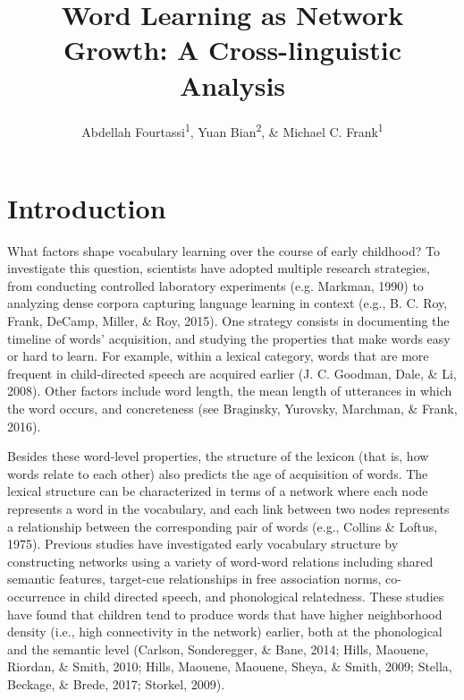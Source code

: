 \documentclass[english,floatsintext,man]{apa6}
\title{Word Learning as Network Growth: A Cross-linguistic Analysis}
\author{Abdellah Fourtassi\textsuperscript{1}, Yuan Bian\textsuperscript{2}, \& Michael C. Frank\textsuperscript{1}}
\affiliation{
    \vspace{0.5cm}
          \textsuperscript{1} Department of Psychology, Stanford University\\
          \textsuperscript{2} Department of Psychology, University of Illinois  }
\theoremstyle{definition}
\theoremstyle{definition}
\theoremstyle{definition}
\theoremstyle{remark}
\begin{document}
\maketitle

\setcounter{secnumdepth}{0}



\section{Introduction}\label{introduction}

What factors shape vocabulary learning over the course of early
childhood? To investigate this question, scientists have adopted
multiple research strategies, from conducting controlled laboratory
experiments (e.g. Markman, 1990) to analyzing dense corpora capturing
language learning in context (e.g., B. C. Roy, Frank, DeCamp, Miller, \&
Roy, 2015). One strategy consists in documenting the timeline of words'
acquisition, and studying the properties that make words easy or hard to
learn. For example, within a lexical category, words that are more
frequent in child-directed speech are acquired earlier (J. C. Goodman,
Dale, \& Li, 2008). Other factors include word length, the mean length
of utterances in which the word occurs, and concreteness (see Braginsky,
Yurovsky, Marchman, \& Frank, 2016).

Besides these word-level properties, the structure of the lexicon (that
is, how words relate to each other) also predicts the age of acquisition
of words. The lexical structure can be characterized in terms of a
network where each node represents a word in the vocabulary, and each
link between two nodes represents a relationship between the
corresponding pair of words (e.g., Collins \& Loftus, 1975). Previous
studies have investigated early vocabulary structure by constructing
networks using a variety of word-word relations including shared
semantic features, target-cue relationships in free association norms,
co-occurrence in child directed speech, and phonological relatedness.
These studies have found that children tend to produce words that have
higher neighborhood density (i.e., high connectivity in the network)
earlier, both at the phonological and the semantic level (Carlson,
Sonderegger, \& Bane, 2014; Hills, Maouene, Riordan, \& Smith, 2010;
Hills, Maouene, Maouene, Sheya, \& Smith, 2009; Stella, Beckage, \&
Brede, 2017; Storkel, 2009).
\end{document}
